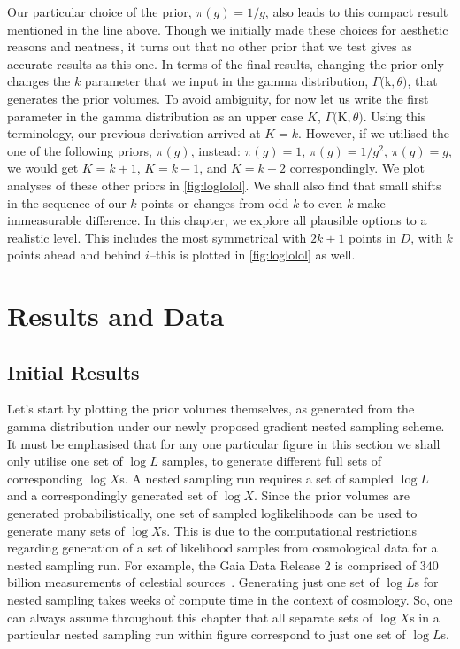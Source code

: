 Our particular choice of the prior, $\pi (g)=1/g$, also leads to this compact result mentioned in the line above. Though we initially made these choices for aesthetic reasons and neatness, it turns out that no other prior that we test gives as accurate results as this one.  In terms of the final results, changing the prior only changes the $k$ parameter that we input in the gamma distribution, $\Gamma ($k$,\theta)$, that generates the prior volumes. To avoid ambiguity, for now let us write the first parameter in the gamma distribution as an upper case $K$, $\Gamma ($K$,\theta)$. Using this terminology, our previous derivation arrived at $K=k$. However, if we utilised the one of the following priors, $\pi (g)$, instead: $\pi (g)=1$, $\pi (g)=1/g^2$, $\pi (g)=g$, we would get $K=k+1$, $K=k-1$, and $K=k+2$ correspondingly. We plot analyses of these other priors in \cref{fig:loglolol}. We shall also find that small shifts in the sequence of our $k$ points or changes from odd $k$ to even $k$ make immeasurable difference. In this chapter, we explore all plausible options to a realistic level. This includes the most symmetrical  with $2k+1$ points in $D$, with $k$ points ahead and behind $i$--this is plotted in \cref{fig:loglolol} as well.



\section{Results and Data}

\subsection{Initial Results}

Let's start by plotting the prior volumes themselves, as generated from the gamma distribution under our newly proposed gradient nested sampling scheme. It must be emphasised that for any one particular figure in this section we shall only utilise one set of $\log L$ samples, to generate different full sets of corresponding $\log X$s. A nested sampling run requires a set of sampled $\log L$ and a correspondingly generated set of $\log X$. Since the prior volumes are generated probabilistically, one set of sampled loglikelihoods can be used to generate many sets of $\log X$s. This is due to the computational restrictions regarding generation of a set of likelihood samples from cosmological data for a nested sampling run. For example, the Gaia Data Release 2 is comprised of $340$ billion measurements of celestial sources~\cite{gaia_in_the_uk}. Generating just one set of $\log L$s for nested sampling takes weeks of compute time in the context of cosmology. So, one can always assume throughout this chapter that all separate sets of $\log X$s in a particular nested sampling run within figure correspond to just one set of $\log L$s. 

